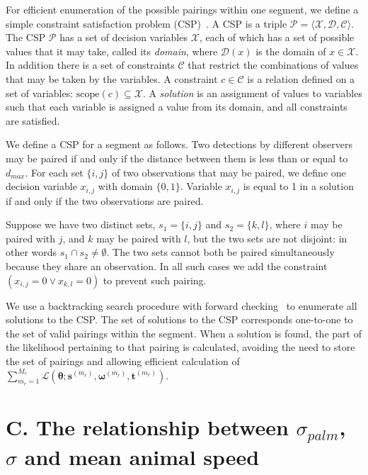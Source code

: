 \documentclass[useAMS, usenatbib, referee]{biom}\usepackage[]{graphicx}\usepackage[]{color}
\begin{document}
For efficient enumeration of the possible pairings within one segment, we define a simple constraint satisfaction problem (CSP)~\cite[Chapter 6]{russell-norvig-aima3}. A CSP is a triple \(\mathcal{P}=\langle \mathcal{X}, \mathcal{D}, \mathcal{C} \rangle\).  The CSP \(\mathcal{P}\) has a set of decision variables \(\mathcal{X}\), each of which has a set of possible values that it may take, called its \textit{domain}, where \(\mathcal{D}(x)\) is the domain of \(x \in \mathcal{X}\). In addition there is a set of constraints \(\mathcal{C}\) that restrict the combinations of values that may be taken by the variables. A constraint \(c\in \mathcal{C}\) is a relation defined on a set of variables: \(\mathrm{scope}(c)\subseteq \mathcal{X}\). A \textit{solution} is an assignment of values to variables such that each variable is assigned a value from its domain, and all constraints are satisfied.

We define a CSP for a segment as follows. Two detections by different observers may be paired if and only if the distance between them is less than or equal to \(d_{max}\). For each set \(\{i,j\}\) of two observations that may be paired, we define one decision variable \(x_{i,j}\) with domain \(\{0,1\}\). Variable \(x_{i,j}\) is equal to 1 in a solution if and only if the two observations are paired.

Suppose we have two distinct sets, \(s_1=\{i,j\}\) and \(s_2=\{k,l\}\), where  \(i\) may be paired with \(j\), and \(k\) may be paired with \(l\), but the two sets are not disjoint: in other words \(s_1 \cap s_2 \ne \emptyset\). The two sets cannot both be paired simultaneously because they share an observation. In all such cases we add the constraint \((x_{i,j}=0 \vee x_{k,l}=0)\) to prevent such pairing.

We use a backtracking search procedure with forward checking~\cite[Chapter 6]{russell-norvig-aima3} to enumerate all solutions to the CSP. The set of solutions to the CSP corresponds one-to-one to the set of valid pairings within the segment. When a solution is found, the part of the likelihood pertaining to that pairing is calculated, avoiding the need to store the set of pairings and allowing efficient calculation of $\sum_{m_r=1}^{M_r}\mathcal{L}\left(\bm{\theta};\bm{s}^{(m_r)},\bm{\omega}^{(m_r)},\bm{t}^{(m_r)}\right)$.

\section{C. The relationship between $\sigma_{palm}$, $\sigma$ and mean animal speed}
\label{appx:sigmaspd}
\end{document}
